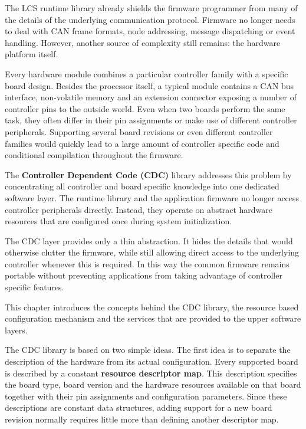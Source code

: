 %

The LCS runtime library already shields the firmware programmer from many of the 
details of the underlying communication protocol. Firmware no longer needs to deal
 with CAN frame formats, node addressing, message dispatching or event handling. 
 However, another source of complexity still remains: the hardware platform itself.

Every hardware module combines a particular controller family with a specific board
design. Besides the processor itself, a typical module contains a CAN bus interface,
non-volatile memory and an extension connector exposing a number of controller 
pins to the outside world. Even when two boards perform the same task, they 
often differ in their pin assignments or make use of different controller 
peripherals. Supporting several board revisions or even different controller 
families would quickly lead to a large amount of controller specific code and 
conditional compilation throughout the firmware.

The \textbf{Controller Dependent Code (CDC)} library addresses this problem by 
concentrating all controller and board specific knowledge into one dedicated 
software layer. The runtime library and the application firmware no longer
access controller peripherals directly. Instead, they operate on abstract hardware
resources that are configured once during system initialization.

The CDC layer provides only a thin abstraction. It hides the details
that would otherwise clutter the firmware, while still allowing direct access to
the underlying controller whenever this is required. In this way the common 
firmware remains portable without preventing applications from taking advantage
 of controller specific features.

This chapter introduces the concepts behind the CDC library, the resource based
configuration mechanism and the services that are provided to the upper software 
layers.



The CDC library is based on two simple ideas.
The first idea is to separate the description of the hardware from its actual
configuration. Every supported board is described by a constant
\textbf{resource descriptor map}. This description specifies the board type,
board version and the hardware resources available on that board together with
their pin assignments and configuration parameters. Since these descriptions are
constant data structures, adding support for a new board revision normally
requires little more than defining another descriptor map.

